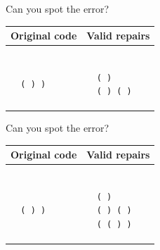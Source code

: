 \documentclass{beamer}
\begin{document}
  \begin{frame}[fragile]{Can you spot the error?}
  \begin{center}
  \begin{tabular}{|m{5.5cm}|m{5.5cm}|}
  \hline \rule{0pt}{2.5ex}\textbf{Original code}\rule[-1ex]{0pt}{2ex} &  \rule{0pt}{2.5ex}\textbf{Valid repairs}\rule[-1ex]{0pt}{2ex} \\\hline
  \begin{lstlisting}[escapechar=!, basicstyle=\linespread{1.3}\ttfamily\footnotesize]

  ( ) )

  \end{lstlisting} & \begin{lstlisting}[escapechar=!, basicstyle=\linespread{1.3}\ttfamily\footnotesize]

  ( )
  ( ) ( )

  \end{lstlisting} \\\hline
  \end{tabular}
  \end{center}
  \end{frame}

  \begin{frame}[fragile]{Can you spot the error?}
  \begin{center}
  \begin{tabular}{|m{5.5cm}|m{5.5cm}|}
  \hline \rule{0pt}{2.5ex}\textbf{Original code}\rule[-1ex]{0pt}{2ex} &  \rule{0pt}{2.5ex}\textbf{Valid repairs}\rule[-1ex]{0pt}{2ex} \\\hline
  \begin{lstlisting}[escapechar=!, basicstyle=\linespread{1.3}\ttfamily\footnotesize]

  ( ) )

  \end{lstlisting} & \begin{lstlisting}[escapechar=!, basicstyle=\linespread{1.3}\ttfamily\footnotesize]

  ( )
  ( ) ( )
  ( ( ) )

  \end{lstlisting} \\\hline
  \end{tabular}
  \end{center}
  \end{frame}
\end{document}
